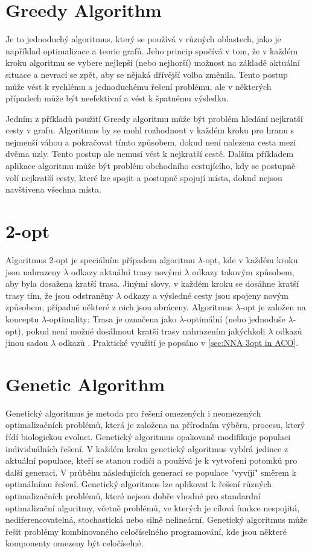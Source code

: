 \section{Greedy Algorithm}
Je  to jednoduchý algoritmus, který se používá v různých oblastech, jako je například optimalizace a teorie grafů. Jeho princip spočívá v tom, že v každém kroku algoritmu se vybere nejlepší (nebo nejhorší) možnost na základě aktuální situace a nevrací se zpět, aby se nějaká dřívější volba změnila. Tento postup může vést k rychlému a jednoduchému řešení problému, ale v některých případech může být neefektivní a vést k špatnému výsledku.

Jedním z příkladů použití Greedy algoritmu může být problém hledání nejkratší cesty v grafu. Algoritmus by se mohl rozhodnout v každém kroku pro hranu s nejmenší váhou a pokračovat tímto způsobem, dokud není nalezena cesta mezi dvěma uzly. Tento postup ale nemusí vést k nejkratší cestě. Dalším příkladem aplikace algoritmu může být problém obchodního cestujícího, kdy se postupně volí nejkratší cesty, které lze spojit a postupně spojují místa, dokud nejsou navštívena všechna místa.
\section{2-opt}
Algoritmus 2-opt je speciálním případem algoritmu $\lambda$-opt, kde v každém kroku jsou nahrazeny $\lambda$ odkazy aktuální trasy novými $\lambda$ odkazy takovým způsobem, aby byla dosažena kratší trasa. Jinými slovy, v každém kroku se dosáhne kratší trasy tím, že jsou odstraněny $\lambda$ odkazy a výsledné cesty jsou spojeny novým způsobem, případně některé z nich jsou obráceny.
Algoritmus $\lambda$-opt je založen na konceptu $\lambda$-optimality:
Trasa je označena jako $\lambda$-optimální (nebo jednoduše $\lambda$-opt), pokud není možné dosáhnout kratší trasy nahrazením jakýchkoli $\lambda$ odkazů jinou sadou $\lambda$ odkazů \cite{helsgaun2000effective}. Praktické využití je popsáno v \ref{sec:NNA 3opt in ACO}.

\section{Genetic Algorithm}
Genetický algoritmus je metoda pro řešení omezených i neomezených optimalizačních problémů, která je založena na přírodním výběru, procesu, který řídí biologickou evoluci. Genetický algoritmus opakovaně modifikuje populaci individuálních řešení. V každém kroku genetický algoritmus vybírá jedince z aktuální populace, kteří se stanou rodiči a používá je k vytvoření potomků pro další generaci. V průběhu následujících generací se populace "vyvíjí" směrem k optimálnímu řešení. Genetický algoritmus lze aplikovat k řešení různých optimalizačních problémů, které nejsou dobře vhodné pro standardní optimalizační algoritmy, včetně problémů, ve kterých je cílová funkce nespojitá, nediferencovatelná, stochastická nebo silně nelineární. Genetický algoritmus může řešit problémy kombinovaného celočíselného programování, kde jsou některé komponenty omezeny být celočíselné. \cite{mathworks-genetic-algorithm}
